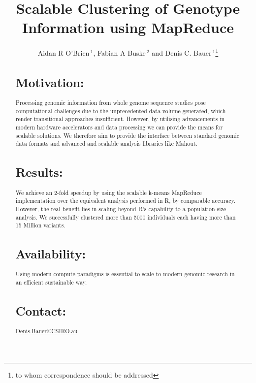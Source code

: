 \documentclass{bioinfo}
\begin{document}

\newcommand{\OneReal}{OneChr\_1K}
\newcommand{\SixReal}{SixChr\_1K}
\newcommand{\FullReal}{Full\_1K}
\newcommand{\SixArtiExact}{Chr19\_5K\_0}
\newcommand{\SixArtiNoise}{Chr19\_5K\_10}


\title[MapReduce Clustering]{Scalable Clustering of Genotype Information using MapReduce}
\author[O'Brien \textit{et~al}]{Aidan R O'Brien\,$^{1}$, Fabian A Buske\,$^{2}$ and Denis C. Bauer\,$^1$\footnote{to whom correspondence should be addressed}}
\address{$^{1}$CSIRO, Digital Productivity Flagship, 11 Julius Av, 2113, Sydney, Australia\\
$^{2}$Cancer Epigenetics Program, Cancer Research Division, Kinghorn Cancer Centre, Garvan Institute of Medical Research, 384 Victoria St, 2010, Sydney, Australia}



\maketitle

\begin{abstract}

\section{Motivation:}
Processing genomic information from whole genome sequence studies pose computational challenges due to the unprecedented data volume generated, which render transitional approaches insufficient. However, by utilising advancements in modern hardware accelerators and data processing we can provide the means for scalable solutions. We therefore aim to provide the interface between standard genomic data formats and advanced and scalable analysis libraries like Mahout. 
\section{Results:}
We achieve an 2-fold speedup by using the scalable k-means MapReduce implementation over the equivalent analysis performed in R, by comparable accuracy. However, the real benefit lies in scaling beyond R's capability to a population-size analysis. We successfully clustered more than 5000 individuals each having more than 15 Million variants. 

\section{Availability:}
Using modern compute paradigms is essential to scale to modern genomic research in an efficient sustainable way. 

\section{Contact:} \href{Denis.Bauer@CSIRO.au}{Denis.Bauer@CSIRO.au}
\end{abstract}
\end{document}
